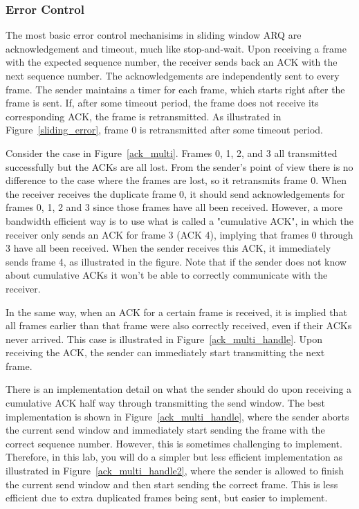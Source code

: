 \documentclass[11pt]{article}
\begin{document}
\subsubsection{Error Control}
The most basic error control mechanisims in sliding window ARQ are acknowledgement and timeout, much like stop-and-wait.
Upon receiving a frame with the expected sequence number, the receiver sends back an ACK with the next sequence number.
The acknowledgements are independently sent to every frame.
The sender maintains a timer for each frame, which starts right after the frame is sent.
If, after some timeout period, the frame does not receive its corresponding ACK, the frame is retransmitted.
As illustrated in Figure~\ref{sliding_error}, frame 0 is retransmitted after some timeout period.

Consider the case in Figure~\ref{ack_multi}. Frames 0, 1, 2, and 3 all transmitted successfully but the ACKs are all lost.
From the sender's point of view there is no difference to the case where the frames are lost, so it retransmits frame 0.
When the receiver receives the duplicate frame 0, it should send acknowledgements for frames 0, 1, 2 and 3 since those frames have all been received.
However, a more bandwidth efficient way is to use what is called a "cumulative ACK", in which the receiver only sends an ACK for frame 3 (ACK 4), implying that frames 0 through 3 have all been received.
When the sender receives this ACK, it immediately sends frame 4, as illustrated in the figure.
Note that if the sender does not know about cumulative ACKs it won't be able to correctly communicate with the receiver.

In the same way, when an ACK for a certain frame is received, it is implied that all frames earlier than that frame were also correctly received, even if their ACKs never arrived. This case is illustrated in Figure~\ref{ack_multi_handle}.
Upon receiving the ACK, the sender can immediately start transmitting the next frame.

There is an implementation detail on what the sender should do upon receiving a cumulative ACK half way through transmitting the send window.
The best implementation is shown in Figure~\ref{ack_multi_handle}, where the sender aborts the current send window and immediately start sending the frame with the correct sequence number.
However, this is sometimes challenging to implement.
Therefore, in this lab, you will do a simpler but less efficient implementation as illustrated in Figure~\ref{ack_multi_handle2}, where the sender is allowed to finish the current send window and then start sending the correct frame.
This is less efficient due to extra duplicated frames being sent, but easier to implement.
\end{document}
